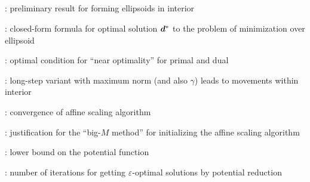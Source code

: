 \subsection*{}
\item {}: preliminary result for forming ellipsoids in interior
\item {}: closed-form formula for optimal
solution \(\bm{d}^{*}\) to the problem of minimization over ellipsoid
\item {}: optimal condition for ``near
optimality'' for primal and dual
\item {}: long-step variant with maximum
norm (and also \(\gamma\)) leads to movements within interior
\item {}: convergence of affine scaling algorithm
\item {}: justification for the ``big-\(M\) method'' for initializing the affine scaling algorithm
\item {}: lower bound on the potential function
\item {}: number of iterations for getting \(\varepsilon\)-optimal solutions by potential reduction
